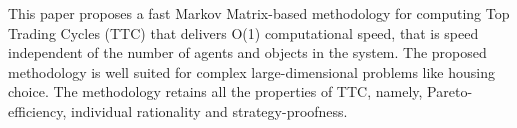 This paper proposes a fast Markov Matrix-based methodology for computing Top Trading Cycles (TTC) that delivers O(1) computational speed, that is speed independent of the number of agents and objects in the system. The proposed methodology is well suited for complex large-dimensional problems like housing choice. The methodology retains all the properties of TTC, namely, Pareto-efficiency, individual rationality and strategy-proofness.